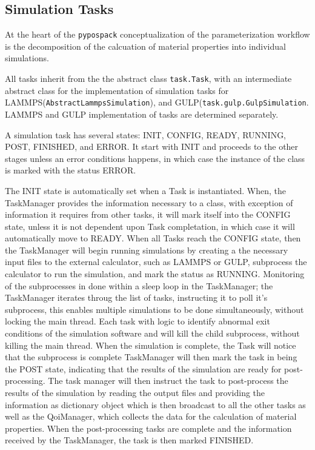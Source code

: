 \subsection{Simulation Tasks}
At the heart of the \verb|pypospack| conceptualization of the parameterization workflow is the decomposition of the calcuation of material properties into individual simulations.

All tasks inherit from the the abstract class \verb|task.Task|, with an intermediate abstract class for the implementation of simulation tasks for LAMMPS(\verb|AbstractLammpsSimulation|), and GULP(\verb|task.gulp.GulpSimulation|.  LAMMPS and GULP implementation of tasks are determined separately.

A simulation task has several states: INIT, CONFIG, READY, RUNNING, POST, FINISHED, and ERROR.  It start with INIT and proceeds to the other stages unless an error conditions happens, in which case the instance of the class is marked with the status ERROR.

The INIT state is automatically set when a Task is instantiated.
When, the TaskManager provides the information necessary to a class, with exception of information it requires from other tasks, it will mark itself into the CONFIG state, unless it is not dependent upon Task completation, in which case it will automatically move to READY.
When all Tasks reach the CONFIG state, then the TaskManager will begin running simulations by creating a the necessary input files to the external calculator, such as LAMMPS or GULP, subprocess the calculator to run the simulation, and mark the status as RUNNING.
Monitoring of the subprocesses in done within a sleep loop in the TaskManager; the TaskManager iterates throug the list of tasks, instructing it to poll it's subprocess, this enables multiple simulations to be done simultaneously, without locking the main thread.  Each task with logic to identify abnormal exit conditions of the simulation software and will kill the child subprocess, without killing the main thread.
When the simulation is complete, the Task will notice that the subprocess is complete TaskManager will then mark the task in being the POST state, indicating that the results of the simulation are ready for post-processing.  The task manager will then instruct the task to post-process the results of the simulation by reading the output files and providing the information as dictionary object which is then broadcast to all the other tasks as well as the QoiManager, which collects the data for the calculation of material properties.  When the post-processing tasks are complete and the information received by the TaskManager, the task is then marked FINISHED.

